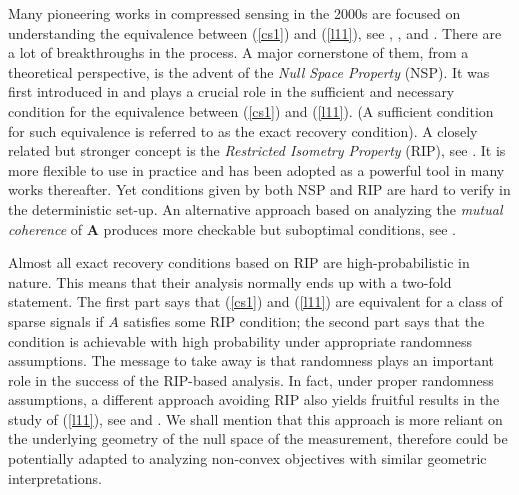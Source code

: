 \documentclass[11pt]{article}
\numberwithin{equation}{section}
\theoremstyle{plain}
\theoremstyle{definition}
\def\A{{\mathbf A}}
\begin{document}
Many pioneering works in compressed sensing in the 2000s are focused on understanding the equivalence between (\ref{cs1}) and (\ref{l11}), see \cite{donoho2006compressed}, \cite{candes2004near}, \cite{   emmanuel2004robust} and \cite{donoho2001uncertainty}. There are a lot of breakthroughs in the process. A major cornerstone of them, from a theoretical perspective, is the advent of the \emph{Null Space Property} (NSP). It was first introduced in \cite{cohen2009compressed} and plays a crucial role in the sufficient and necessary condition for the equivalence between (\ref{cs1}) and (\ref{l11}). (A sufficient condition for such equivalence is referred to as the exact recovery condition). A closely related but stronger concept is the \emph{Restricted Isometry Property} (RIP), see \cite{candes2004near}. It is more flexible to use in practice and has been adopted as a powerful tool in many works thereafter. Yet conditions given by both NSP and RIP are hard to verify in the deterministic set-up. An alternative approach based on analyzing the \emph{mutual coherence} of $\A$ produces more checkable but suboptimal conditions, see \cite{donoho2003optimally}. 

Almost all exact recovery conditions based on RIP are high-probabilistic in nature. This means that their analysis normally ends up with a two-fold statement. The first part says that (\ref{cs1}) and (\ref{l11}) are equivalent for a class of sparse signals if $A$ satisfies some RIP condition; the second part says that the condition is achievable with high probability under appropriate randomness assumptions. The message to take away is that randomness plays an important role in the success of the RIP-based analysis. In fact, under proper randomness assumptions, a different approach avoiding RIP also yields fruitful results in the study of (\ref{l11}), see \cite{zhang2013theory} and \cite{vershynin2015estimation}. We shall mention that this approach is more reliant on the underlying geometry of the null space of the measurement, therefore could be potentially adapted to analyzing non-convex objectives with similar geometric interpretations. 
\end{document}
